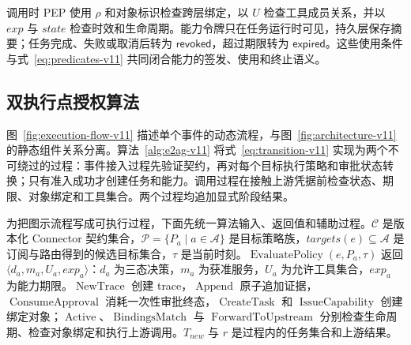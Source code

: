 调用时 PEP 使用 $\rho$ 和对象标识检查跨层绑定，以 $U$ 检查工具成员关系，并以 $exp$ 与 $state$ 检查时效和生命周期。能力令牌只在任务运行时可见，持久层保存摘要；任务完成、失败或取消后转为 $\mathsf{revoked}$，超过期限转为 $\mathsf{expired}$。这些使用条件与式~\eqref{eq:predicates-v11} 共同闭合能力的签发、使用和终止语义。

\subsection{双执行点授权算法}



图~\ref{fig:execution-flow-v11} 描述单个事件的动态流程，与图~\ref{fig:architecture-v11} 的静态组件关系分离。算法~\ref{alg:e2ag-v11} 将式~\eqref{eq:transition-v11} 实现为两个不可绕过的过程：事件接入过程先验证契约，再对每个目标执行策略和审批状态转换；只有准入成功才创建任务和能力。调用过程在接触上游凭据前检查状态、期限、对象绑定和工具集合。两个过程均追加显式阶段结果。

为把图示流程写成可执行过程，下面先统一算法输入、返回值和辅助过程。$\mathcal{C}$ 是版本化 Connector 契约集合，$\mathcal{P}=\{P_a\mid a\in\mathcal{A}\}$ 是目标策略族，$targets(e)\subseteq\mathcal{A}$ 是订阅与路由得到的候选目标集合，$\tau$ 是当前时刻。$\operatorname{EvaluatePolicy}(e,P_a,\tau)$ 返回 $\langle d_a,m_a,U_a,exp_a\rangle$：$d_a$ 为三态决策，$m_a$ 为获准服务，$U_a$ 为允许工具集合，$exp_a$ 为能力期限。$\operatorname{NewTrace}$ 创建 trace，$\operatorname{Append}$ 原子追加证据，$\operatorname{ConsumeApproval}$ 消耗一次性审批终态，$\operatorname{CreateTask}$ 和 $\operatorname{IssueCapability}$ 创建绑定对象；$\operatorname{Active}$、$\operatorname{BindingsMatch}$ 与 $\operatorname{ForwardToUpstream}$ 分别检查生命周期、检查对象绑定和执行上游调用。$T_{new}$ 与 $r$ 是过程内的任务集合和上游结果。

